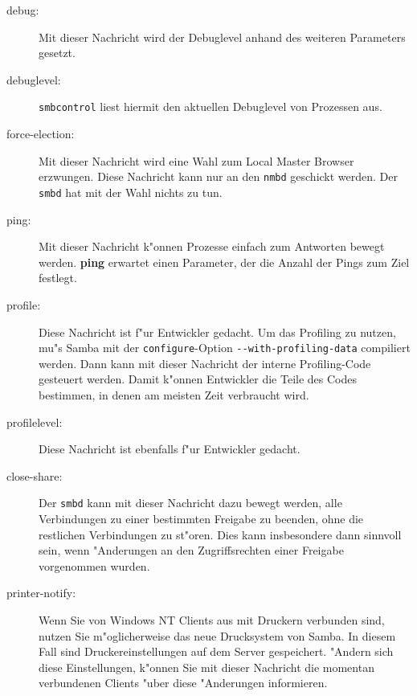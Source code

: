 \documentclass{scrartcl}\usepackage{pslatex}\typearea{12}
\newcommand{\prog}{\texttt}
\begin{document}
\begin{description}
\item[debug:] Mit dieser Nachricht wird der Debuglevel anhand des
  weiteren Parameters gesetzt.
\item[debuglevel:] \prog{smbcontrol} liest hiermit den aktuellen
  Debuglevel von Prozessen aus.
\item[force-election:] Mit dieser Nachricht wird eine Wahl zum Local
  Master Browser erzwungen. Diese Nachricht kann nur an den
  \prog{nmbd} geschickt werden. Der \prog{smbd} hat mit der Wahl
  nichts zu tun.
\item[ping:] Mit dieser Nachricht k"onnen Prozesse einfach zum
  Antworten bewegt werden. {\bfseries ping} erwartet einen Parameter,
  der die Anzahl der Pings zum Ziel festlegt.
\item[profile:] Diese Nachricht ist f"ur Entwickler gedacht. Um das
  Profiling zu nutzen, mu"s Samba mit der \prog{configure}-Option
  \texttt{-{}-with-profiling-data} compiliert werden. Dann kann mit
  dieser Nachricht der interne Profiling-Code gesteuert werden.  Damit
  k"onnen Entwickler die Teile des Codes bestimmen, in denen am
  meisten Zeit verbraucht wird.
\item[profilelevel:] Diese Nachricht ist ebenfalls f"ur Entwickler
  gedacht.
\item[close-share:] Der \prog{smbd} kann mit dieser Nachricht dazu
  bewegt werden, alle Verbindungen zu einer bestimmten Freigabe zu
  beenden, ohne die restlichen Verbindungen zu st"oren. Dies kann
  insbesondere dann sinnvoll sein, wenn "Anderungen an den
  Zugriffsrechten einer Freigabe vorgenommen wurden.
\item[printer-notify:] Wenn Sie von Windows NT Clients aus mit
  Druckern verbunden sind, nutzen Sie m"oglicherweise das neue
  Drucksystem von Samba. In diesem Fall sind Druckereinstellungen auf
  dem Server gespeichert. "Andern sich diese Einstellungen, k"onnen
  Sie mit dieser Nachricht die momentan verbundenen Clients "uber
  diese "Anderungen informieren.
\end{description}
\end{document}
